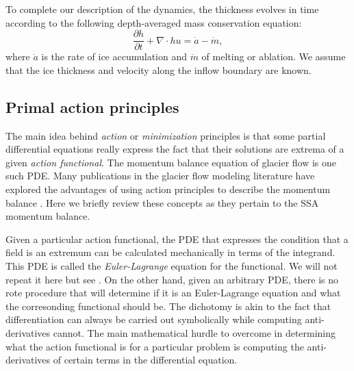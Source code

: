 \documentclass[twocolumn,letterpaper]{igs}
\begin{document}
To complete our description of the dynamics, the thickness evolves in time according to the following depth-averaged mass conservation equation:
\begin{equation}
    \frac{\partial h}{\partial t} + \nabla \cdot hu = \dot a - \dot m,
    \label{eq:conservation-mass}
\end{equation}
where $\dot a$ is the rate of ice accumulation and $\dot m$ of melting or ablation.
We assume that the ice thickness and velocity along the inflow boundary are known.


\subsection{Primal action principles}
\label{sec:primal-action-principles}

The main idea behind \emph{action} or \emph{minimization} principles is that some partial differential equations really express the fact that their solutions are extrema of a given \emph{action functional}.
The momentum balance equation of glacier flow is one such PDE.
Many publications in the glacier flow modeling literature have explored the advantages of using action principles to describe the momentum balance \citep{bassis2010hamilton, dukowicz2010consistent, brinkerhoff2013data, shapero2021icepack}.
Here we briefly review these concepts as they pertain to the SSA momentum balance.

Given a particular action functional, the PDE that expresses the condition that a field is an extremum can be calculated mechanically in terms of the integrand.
This PDE is called the \emph{Euler-Lagrange} equation for the functional.
We will not repeat it here but see \citet{weinstock1974calculus}.
On the other hand, given an arbitrary PDE, there is no rote procedure that will determine if it is an Euler-Lagrange equation and what the corresonding functional should be.
The dichotomy is akin to the fact that differentiation can always be carried out symbolically while computing anti-derivatives cannot.
The main mathematical hurdle to overcome in determining what the action functional is for a particular problem is computing the anti-derivatives of certain terms in the differential equation.
\end{document}
